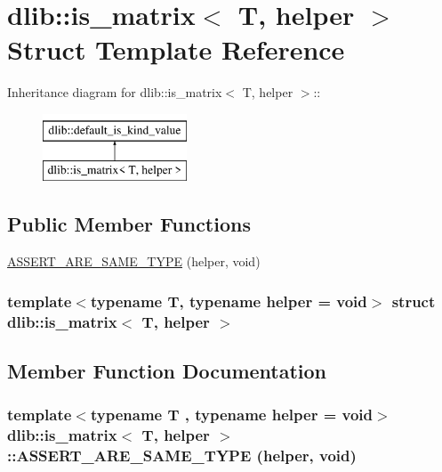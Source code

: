 \hypertarget{structdlib_1_1is__matrix}{
\section{dlib::is\_\-matrix$<$ T, helper $>$ Struct Template Reference}
\label{structdlib_1_1is__matrix}
}
Inheritance diagram for dlib::is\_\-matrix$<$ T, helper $>$::\begin{figure}[H]
\begin{center}
\leavevmode
\includegraphics[height=2cm]{structdlib_1_1is__matrix}
\end{center}
\end{figure}
\subsection*{Public Member Functions}
\begin{DoxyCompactItemize}
\item 
\hyperlink{structdlib_1_1is__matrix_abb2a105e957c1e12a8524f7c8d200cc4}{ASSERT\_\-ARE\_\-SAME\_\-TYPE} (helper, void)
\end{DoxyCompactItemize}
\subsubsection*{template$<$typename T, typename helper = void$>$ struct dlib::is\_\-matrix$<$ T, helper $>$}



\subsection{Member Function Documentation}
\hypertarget{structdlib_1_1is__matrix_abb2a105e957c1e12a8524f7c8d200cc4}{
\subsubsection[{ASSERT\_\-ARE\_\-SAME\_\-TYPE}]{\setlength{\rightskip}{0pt plus 5cm}template$<$typename T , typename helper  = void$>$ {\bf dlib::is\_\-matrix}$<$ T, helper $>$::ASSERT\_\-ARE\_\-SAME\_\-TYPE (helper, \/  void)}}
\label{structdlib_1_1is__matrix_abb2a105e957c1e12a8524f7c8d200cc4}

